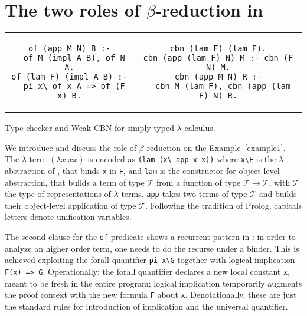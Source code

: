 \documentclass{llncs}
\begin{document}

\section{The two roles of $\beta$-reduction in \lp{}}
\label{sec:beta}

\begin{example}[b]
\begin{center}
\begin{tabular}{c@{~~}|@{~~}c}
\begin{minipage}{4.8cm}
\begin{verbatim}
of (app M N) B :-
  of M (impl A B), of N A.
of (lam F) (impl A B) :-
  pi x\ of x A => of (F x) B.
\end{verbatim}
\end{minipage}
&
\begin{minipage}{6.2cm}
\begin{verbatim}
cbn (lam F) (lam F).
cbn (app (lam F) N) M :- cbn (F N) M.
cbn (app M N) R :-
  cbn M (lam F), cbn (app (lam F) N) R.
\end{verbatim}
\end{minipage}
\end{tabular}
\end{center}
\caption{\label{example1} Type checker and Weak CBN for simply typed $\lambda$-calculus.}
\end{example}

We introduce \lp{} and discuss the role of $\beta$-reduction on the
Example~\ref{example1}. The $\lambda$-term %
$(\lambda x.xx)$ is encoded %
as \verb+(lam (x\ app x x))+ where \verb+x\F+ is
the $\lambda$-abstraction of \lp{}, that binds \verb+x+ in \verb+F+, and
\verb+lam+ is the constructor for object-level abstraction, that builds
a term of type $\mathcal{T}$ from a function of type
$\mathcal{T} \to \mathcal{T}$, with $\mathcal{T}$ the type of representations
of $\lambda$-terms. \verb+app+ takes two terms of type $\mathcal{T}$ and builds
their object-level application of type $\mathcal{T}$.  Following the tradition of Prolog, capitals letters denote unification variables.

The second clause for the \verb+of+ predicate shows a recurrent pattern in
\lp: in order to analyze an higher order term, one needs to do the recurse
under a binder. This is achieved
exploiting the forall quantifier \verb+pi x\G+ together with logical
implication \verb+F(x) => G+. Operationally: the forall quantifier declares a
new local constant \verb+x+, meant to be fresh in the entire program;
logical implication temporarily
augments the proof context with the new formula \verb+F+ about \verb+x+.
Denotationally, these are just the standard rules for introduction of
implication and the universal quantifier.
\end{document}
